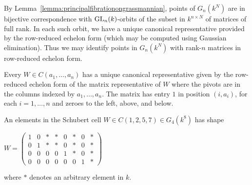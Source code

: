 \documentclass[a4paper,openany]{scrbook}
\begin{document}
\begin{remark}\label{rem:echelonform}
By Lemma~\ref{lemma:principalfibrationongrassmannian}, points of $G_n(k^N)$ are in bijective correspondence with $\operatorname{GL}_n(k)$-orbits of the subset in $k^{n\times N}$ of matrices of full rank. In each  such orbit, we have a unique canonical representative provided by the row-reduced echelon form (which may be computed using Gaussian elimination). 
Thus we may identify points in $G_n(k^N)$ with rank-$n$ matrices in row-reduced echelon form.
\end{remark}

Every $W\in C(a_1,\dots ,a_n)$ has a unique canonical representative given by the row-reduced echelon form of the matrix representative of $W$ where the pivots are in the columns indexed by $a_1,\dots ,a_n$. The matrix has entry $1$ in position $(i,a_i)$, for each $i=1,\dots ,n$ and zeroes to the left, above, and below.

\begin{example} \label{ex:echelonform}
An elements in the Schubert cell $W\in C(1,2,5,7) \in G_4(k^{8})$ has shape
\begin{center}
$W = \begin{pmatrix}
  1 & 0 & * & * & 0 & * & 0 & * \\
  0 & 1 & * & * & 0 & * & 0 & * \\
  0 & 0 & 0 & 0 & 1 & * & 0 & * \\
  0 & 0 & 0 & 0 & 0 & 0 & 1 & *
 \end{pmatrix}$
\end{center}  \noindent
where $*$ denotes an arbitrary element in $k$.  
\end{example} \noindent
\end{document}
